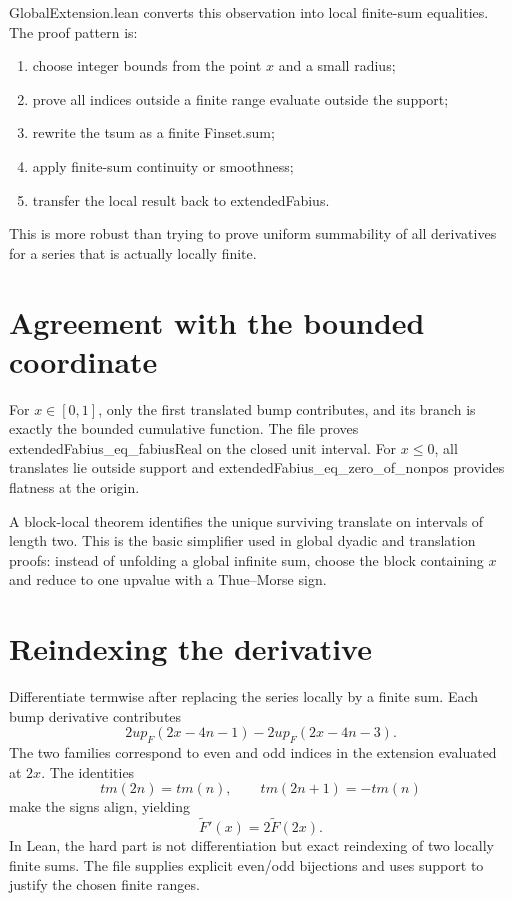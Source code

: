 \documentclass[11pt,a4paper,openany]{book}
\def\module#1{#1.lean}
\def\decl#1{#1}
\def\code#1{#1}
\def\upfun{up}
\def\TM{tm}
\newcommand{\upfun}{\ensuremath{\operatorname{up}}}
\newcommand{\TM}{\ensuremath{\operatorname{tm}}}
\newcommand{\module}[1]{\nolinkurl{#1.lean}}
\newcommand{\decl}[1]{\texttt{\detokenize{#1}}}
\newcommand{\code}[1]{\texttt{\detokenize{#1}}}
\begin{document}
\module{GlobalExtension} converts this observation into local finite-sum
equalities.  The proof pattern is:
\begin{enumerate}
  \item choose integer bounds from the point $x$ and a small radius;
  \item prove all indices outside a finite range evaluate outside the support;
  \item rewrite the \code{tsum} as a finite \code{Finset.sum};
  \item apply finite-sum continuity or smoothness;
  \item transfer the local result back to \decl{extendedFabius}.
\end{enumerate}
This is more robust than trying to prove uniform summability of all derivatives
for a series that is actually locally finite.

\section{Agreement with the bounded coordinate}
For $x\in[0,1]$, only the first translated bump contributes, and its branch is
exactly the bounded cumulative function.  The file proves
\decl{extendedFabius_eq_fabiusReal} on the closed unit interval.  For $x\le0$,
all translates lie outside support and \decl{extendedFabius_eq_zero_of_nonpos}
provides flatness at the origin.

A block-local theorem identifies the unique surviving translate on intervals
of length two.  This is the basic simplifier used in global dyadic and
translation proofs: instead of unfolding a global infinite sum, choose the
block containing $x$ and reduce to one \upfun value with a Thue--Morse sign.

\section{Reindexing the derivative}
Differentiate termwise after replacing the series locally by a finite sum.
Each bump derivative contributes
\[
 2\upfun_F(2x-4n-1)-2\upfun_F(2x-4n-3).
\]
The two families correspond to even and odd indices in the extension evaluated
at $2x$.  The identities
\[
 \TM(2n)=\TM(n),\qquad \TM(2n+1)=-\TM(n)
\]
make the signs align, yielding
\[
 \widetilde F'(x)=2\widetilde F(2x).
\]
In Lean, the hard part is not differentiation but exact reindexing of two
locally finite sums.  The file supplies explicit even/odd bijections and uses
support to justify the chosen finite ranges.
\end{document}
